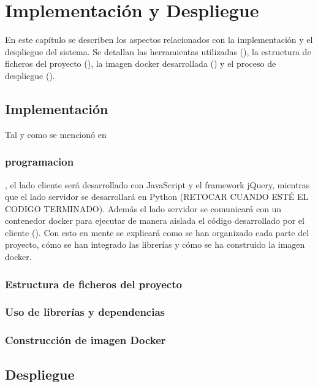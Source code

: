 \chapter{Implementación y Despliegue}\label{chap:implementacion_y_despliegue}
En este capítulo se describen los aspectos relacionados con la implementación y el despliegue del sistema. Se detallan las herramientas utilizadas (), la estructura de ficheros del proyecto (), la imagen docker desarrollada () y el proceso de despliegue ().

\section{Implementación} \label{sec:implementacion}
Tal y como se mencionó en \subsection{programacion}, el lado cliente será desarrollado con JavaScript y el framework jQuery, mientras que el lado servidor se desarrollará en Python (RETOCAR CUANDO ESTÉ EL CODIGO TERMINADO). Además el lado servidor se comunicará con un contenedor docker para ejecutar de manera aislada el código desarrollado por el cliente (). Con esto en mente se explicará como se han organizado cada parte del proyecto, cómo se han integrado las librerías y cómo se ha construido la imagen docker. 

\subsection{Estructura de ficheros del proyecto}\label{subsec:estructura_ficheros_proyecto}

\subsection{Uso de librerías y dependencias} \label{subsec:uso_librerias_dependencias}

\subsection{Construcción de imagen Docker} \label{subsec:construccion_imagen_docker}

\section{Despliegue} \label{sec:despliegue}